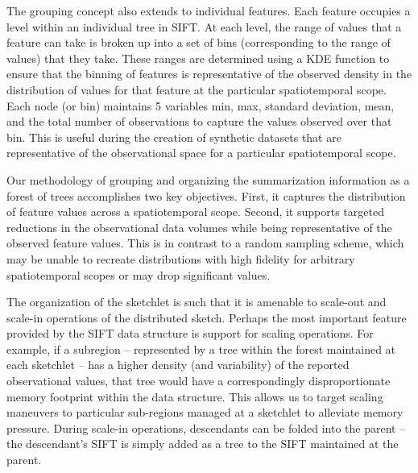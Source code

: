 The grouping concept also extends to individual features. Each feature occupies a level within an individual tree in SIFT. At each level, the range of values that a feature can take is broken up into a set of bins (corresponding to the range of values) that they take. These ranges are determined using a KDE function to ensure that the binning of features is representative of the observed density in the distribution of values for that feature at the particular spatiotemporal scope. Each node (or bin) maintains 5 variables min, max, standard deviation, mean, and the total number of observations to capture the values observed over that bin.  This is useful during the creation of synthetic datasets that are representative of the observational space for a particular spatiotemporal scope.

Our methodology of grouping and organizing the summarization information as a forest of trees accomplishes two key objectives. First, it captures the distribution of feature values across a spatiotemporal scope. Second, it supports targeted reductions in the observational data volumes while being representative of the observed feature values. This is in contrast to a random sampling scheme, which may be unable to recreate distributions with high fidelity for arbitrary spatiotemporal scopes or may drop significant values.

The organization of the sketchlet is such that it is amenable to scale-out and scale-in operations of the distributed sketch. Perhaps the most important feature provided by the SIFT data structure is support for scaling operations. For example, if a subregion – represented by a tree within the forest maintained at each sketchlet – has a higher density (and variability) of the reported observational values, that tree would have a correspondingly disproportionate memory footprint within the data structure. This allows us to target scaling maneuvers to particular sub-regions managed at a sketchlet to alleviate memory pressure.  During scale-in operations, descendants can be folded into the parent – the descendant’s SIFT is simply added as a tree to the SIFT maintained at the parent.